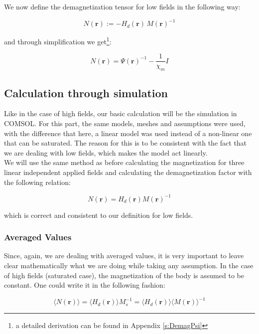 We now define the demagnetization tensor for low fields in the following way:

\begin{equation}
N(\textbf{r}) := -H_d(\textbf{r})\,M(\textbf{r})^{-1}
\end{equation}

and through simplification we get\footnote{a detailed derivation can be found in Appendix \ref{s:DemagPsi}}:

\begin{equation}
N(\textbf{r}) = \Psi(\textbf{r})^{-1} - \frac{1}{\chi_m}I
\end{equation}

\subsection{Calculation through simulation}

Like in the case of high fields, our basic calculation will be the simulation in COMSOL. For this part, the same models, meshes and assumptions were used, with the difference that here, a linear model was used instead of a non-linear one that can be saturated. The reason for this is to be consistent with the fact that we are dealing with low fields, which makes the model act linearly. \\

We will use the same method as before calculating the magnetization for three linear independent applied fields and calculating the demagnetization factor with the following relation:

\begin{equation}
 N(\textbf{r}) =  H_d(\textbf{r})   M(\textbf{r})  ^{-1}
\end{equation}

which is correct and consistent to our definition for low fields.

\subsubsection{Averaged Values}

Since, again, we are dealing with averaged values, it is very important to leave clear mathematically what we are doing while taking any assumption. In the case of high fields (saturated case), the magnetization of the body is assumed to be constant. One could write it in the following fashion:

\begin{equation}
\langle N(\textbf{r}) \rangle = \langle H_d(\textbf{r}) \rangle  M_s ^{-1} = \langle H_d(\textbf{r}) \rangle \langle M(\textbf{r}) \rangle ^{-1}
\end{equation}

